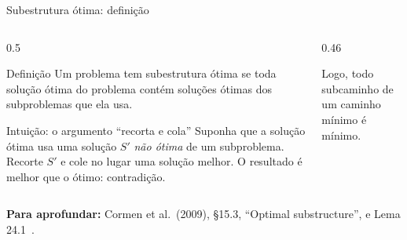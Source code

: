 \documentclass[aspectratio=169,xcolor=table]{beamer}
\newcommand{\fonte}[1]{%
  \vfill
  {\tiny\color{gray!55!black}\textbf{Para aprofundar:} #1\par}%
}
\begin{document}
\begin{frame}{Subestrutura ótima: definição}
  \begin{columns}[c]
    \begin{column}{0.5\textwidth}
      \begin{block}{Definição}
        \scriptsize Um problema tem \alert{subestrutura ótima} se toda solução ótima do
        problema contém soluções ótimas dos subproblemas que ela usa.
      \end{block}
      \begin{exampleblock}{Intuição: o argumento ``recorta e cola''}
        \scriptsize Suponha que a solução ótima usa uma solução $S'$ \emph{não ótima} de um
        subproblema. Recorte $S'$ e cole no lugar uma solução melhor. O resultado é melhor
        que o ótimo: contradição.
      \end{exampleblock}
    \end{column}
    \begin{column}{0.46\textwidth}
      \centering
      \medskip

      {\scriptsize Logo, todo subcaminho de um caminho mínimo é mínimo.}
    \end{column}
  \end{columns}
  \fonte{Cormen et al.\ (2009), \S 15.3, ``Optimal substructure'', e Lema 24.1~\cite{cormen2009introduction}.}
\end{frame}
\end{document}
